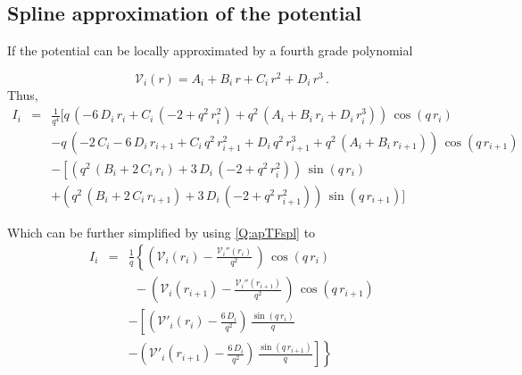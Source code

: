 \subsection{Spline approximation of the potential}

If the potential can be locally approximated by a fourth grade
polynomial

\begin{equation}\label{Q:apTFspl}
\mathcal{V}_{i}(r) = A_{i} + B_{i}\,r +C_{i}\,r^{2}+D_{i}\,r^{3} \, .
\end{equation}%
Thus,
%
\begin{eqnarray*}
I_{i} &=& \frac{1}{q^{4}}\Big[ q\,\left( -6\,D_{i}\,r_{i} +
C_{i}\,\left( -2 + {q^2}\,{r_{i}^2} \right)  + {q^2}\,\left( A_{i} +
B_{i}\,r_{i} + D_{i}\,{r_{i}^3}
\right)  \right) \,\cos (q\,r_{i}) \nonumber \\
&&- q\,\left( -2\,C_{i} - 6\,D_{i}\,r_{i+1} + C_{i}\,{q^2}\,{r_{i+1}^2}
+ D_{i}\,{q^2}\,{r_{i+1}^3} + {q^2}\,\left( A_{i} + B_{i}\,r_{i+1}
\right) \right)
\, \cos (q\,r_{i+1})  \nonumber \\
&&- \left[     \left( {q^2}\,\left( B_{i} + 2\,C_{i}\,r_{i} \right) +
3\, D_{i}\,\left( -2 + {q^2}\,{r_{i}^2} \right) \right) \,\sin
(q\,r_{i}) \right.
\nonumber  \\
&& + \left( {q^2}\,\left( B_{i} + 2\,C_{i}\,r_{i+1} \right)  +
3\,D_{i}\,\left( -2 + {q^2}\,{r_{i+1}^2} \right) \right) \,\sin
(q\,r_{i+1}) \Big]
\end{eqnarray*}

Which can be further simplified by using \ref{Q:apTFspl} to
%
\begin{eqnarray*}
I_{i} &=& \frac{1}{q}\left\{ \left( \mathcal{V}_{i}(r_{i}) -
\frac{\mathcal{V}_{i}''(r_{i})}{q^{2}}\, \right) \right. \,\cos
(q\,r_{i}) \nonumber
\\
&& \;\, - \left( \mathcal{V}_{i}(r_{i+1}) -
\frac{\mathcal{V}_{i}''(r_{i+1})} {q^{2}}\, \right) \, \cos
(q\,r_{i+1})
\nonumber \\
&&- \left[ \left( \mathcal{V}'_{i}(r_{i}) - \frac{6\, D_{i} }{q^{2}}
\right) \,\frac{\sin (q\,r_{i})}{q} \right.
\nonumber \\
&&- \left. \left. \left( \mathcal{V}'_{i}(r_{i+1}) - \frac{6\, D_{i}
}{q^{2}} \right) \,\frac{\sin (q\,r_{i+1})}{q} \right] \right\}
\end{eqnarray*}

